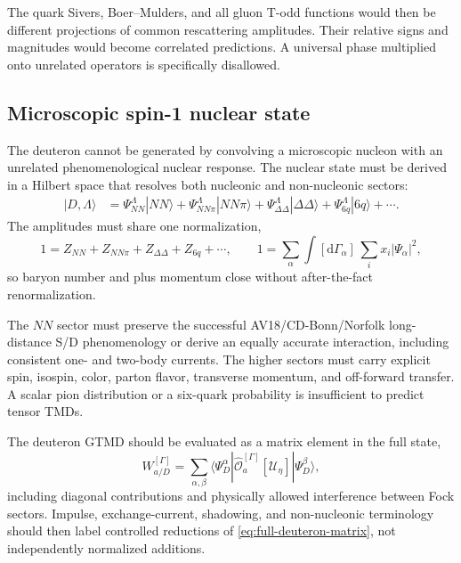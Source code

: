 \documentclass[11pt]{article}
\newcommand{\dd}{\mathrm{d}}
\begin{document}
The quark Sivers, Boer--Mulders, and all gluon T-odd functions would then be
different projections of common rescattering amplitudes.  Their relative
signs and magnitudes would become correlated predictions.  A universal phase
multiplied onto unrelated operators is specifically disallowed.

\subsection{Microscopic spin-1 nuclear state}

The deuteron cannot be generated by convolving a microscopic nucleon with an
unrelated phenomenological nuclear response.  The nuclear state must be
derived in a Hilbert space that resolves both nucleonic and non-nucleonic
sectors:
\begin{align}
|D,\Lambda\rangle
&=\Psi_{NN}^{\Lambda}|NN\rangle
 +\Psi_{NN\pi}^{\Lambda}|NN\pi\rangle
 +\Psi_{\Delta\Delta}^{\Lambda}|\Delta\Delta\rangle
 +\Psi_{6q}^{\Lambda}|6q\rangle
 +\cdots .
\label{eq:deuteron-fock-next}
\end{align}
The amplitudes must share one normalization,
\begin{equation}
1=Z_{NN}+Z_{NN\pi}+Z_{\Delta\Delta}+Z_{6q}+\cdots ,
\qquad
1=\sum_\alpha\int[\dd\Gamma_\alpha]\,
\sum_i x_i|\Psi_\alpha|^2,
\label{eq:fock-normalization}
\end{equation}
so baryon number and plus momentum close without after-the-fact
renormalization.

The \(NN\) sector must preserve the successful AV18/CD-Bonn/Norfolk
long-distance S/D phenomenology or derive an equally accurate interaction,
including consistent one- and two-body currents.  The higher sectors must
carry explicit spin, isospin, color, parton flavor, transverse momentum,
and off-forward transfer.  A scalar pion distribution or a six-quark
probability is insufficient to predict tensor TMDs.

The deuteron GTMD should be evaluated as a matrix element in the full state,
\begin{equation}
W_{a/D}^{[\Gamma]}
=\sum_{\alpha,\beta}
\langle\Psi_D^\alpha|
\widehat{\mathcal O}_{a}^{[\Gamma]}[\mathcal U_\eta]
|\Psi_D^\beta\rangle ,
\label{eq:full-deuteron-matrix}
\end{equation}
including diagonal contributions and physically allowed interference
between Fock sectors.  Impulse, exchange-current, shadowing, and
non-nucleonic terminology should then label controlled reductions of
\cref{eq:full-deuteron-matrix}, not independently normalized additions.
\end{document}
